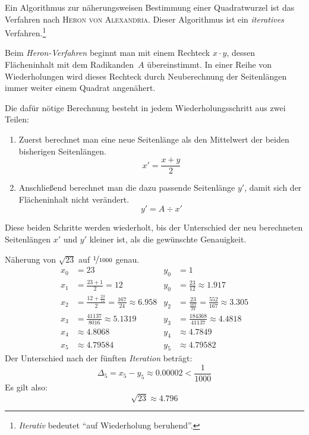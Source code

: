  \begin{regel}
  Ein Algorithmus zur näherungsweisen Bestimmung einer Quadratwurzel ist das Verfahren nach \textsc{Heron von Alexandria}. Dieser Algorithmus ist ein \emph{iteratives} Verfahren.\footnote{\emph{Iterativ} bedeutet "`auf Wiederholung beruhend"'.}
  
  Beim \emph{Heron-Verfahren} beginnt man mit einem Rechteck \(x\cdot y\), dessen Flächeninhalt mit dem Radikanden~\(A\) übereinstimmt. In einer Reihe von Wiederholungen wird dieses Rechteck durch Neuberechnung der Seitenlängen immer weiter einem Quadrat angenähert.
  
  Die dafür nötige Berechnung besteht in jedem Wiederholungsschritt aus zwei Teilen:
  \begin{enumerate}
   \item Zuerst berechnet man eine neue Seitenlänge als den Mittelwert der beiden bisherigen Seitenlängen.
   \begin{equation*}
    x' = \frac{x+y}{2}
   \end{equation*}
   \item Anschließend berechnet man die dazu passende Seitenlänge \(y'\), damit sich der Flächeninhalt nicht verändert.
   \begin{equation*}
    y' = A \div x'
   \end{equation*}
  \end{enumerate}
  
  Diese beiden Schritte werden wiederholt, bis der Unterschied der neu berechneten Seitenlängen \(x'\) und \(y'\) kleiner ist, als die gewünschte Genauigkeit.
 \end{regel}
 
 \begin{bsp}
  Näherung von \(\sqrt{23}\) auf \(\nicefrac{1}{1000}\) genau.
  \begin{align*}
   x_0 &= 23 & y_0 &= 1 \\
   x_1 &= \frac{23+1}{2} = 12 & y_0 &= \frac{23}{12} \approx 1.917 \\
   x_2 &= \frac{12+\frac{23}{12}}{2} = \frac{167}{24} \approx 6.958 & y_2 &= \frac{23}{\frac{167}{24}}=\frac{552}{167}\approx 3.305\\
   x_3 &= \frac{41137}{8016} \approx 5.1319 & y_3 &= \frac{184368}{41137} \approx 4.4818 \\
   x_4 &\approx 4.8068 & y_4 &\approx 4.7849 \\
   x_5 &\approx 4.79584 & y_5 &\approx 4.79582
  \end{align*}
  Der Unterschied nach der fünften \emph{Iteration} beträgt:
  \begin{equation*}
   \Delta_5 = x_5 - y_5  \approx 0.00002 < \frac{1}{1000} 
  \end{equation*}
  Es gilt also:
  \begin{equation*}
   \sqrt{23} \approx 4.796
  \end{equation*}

 \end{bsp}



